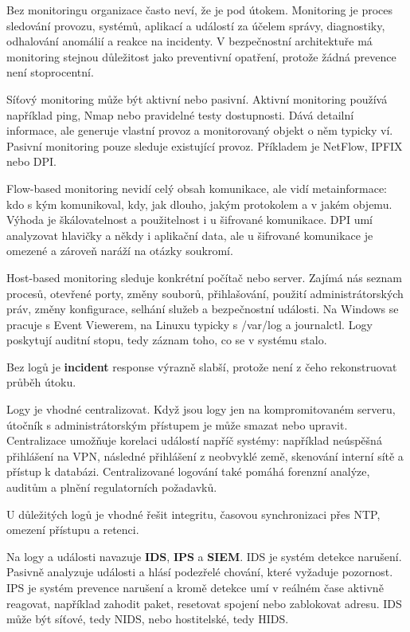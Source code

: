 \documentclass[11pt,a4paper]{article}
\begin{document}
Bez monitoringu organizace často neví, že je pod útokem. Monitoring je proces sledování provozu, systémů, aplikací a událostí za účelem správy, diagnostiky, odhalování anomálií a reakce na incidenty. V bezpečnostní architektuře má monitoring stejnou důležitost jako preventivní opatření, protože žádná prevence není stoprocentní.

Síťový monitoring může být aktivní nebo pasivní. Aktivní monitoring používá například ping, Nmap nebo pravidelné testy dostupnosti. Dává detailní informace, ale generuje vlastní provoz a monitorovaný objekt o něm typicky ví. Pasivní monitoring pouze sleduje existující provoz. Příkladem je NetFlow, IPFIX nebo DPI.

Flow-based monitoring nevidí celý obsah komunikace, ale vidí metainformace: kdo s kým komunikoval, kdy, jak dlouho, jakým protokolem a v jakém objemu. Výhoda je škálovatelnost a použitelnost i u šifrované komunikace. DPI umí analyzovat hlavičky a někdy i aplikační data, ale u šifrované komunikace je omezené a zároveň naráží na otázky soukromí.

Host-based monitoring sleduje konkrétní počítač nebo server. Zajímá nás seznam procesů, otevřené porty, změny souborů, přihlašování, použití administrátorských práv, změny konfigurace, selhání služeb a bezpečnostní události. Na Windows se pracuje s Event Viewerem, na Linuxu typicky s /var/log a journalctl. Logy poskytují auditní stopu, tedy záznam toho, co se v systému stalo.

Bez logů je \textbf{incident} response výrazně slabší, protože není z čeho rekonstruovat průběh útoku.

Logy je vhodné centralizovat. Když jsou logy jen na kompromitovaném serveru, útočník s administrátorským přístupem je může smazat nebo upravit. Centralizace umožňuje korelaci událostí napříč systémy: například neúspěšná přihlášení na VPN, následné přihlášení z neobvyklé země, skenování interní sítě a přístup k databázi. Centralizované logování také pomáhá forenzní analýze, auditům a plnění regulatorních požadavků.

U důležitých logů je vhodné řešit integritu, časovou synchronizaci přes NTP, omezení přístupu a retenci.

Na logy a události navazuje \textbf{IDS}, \textbf{IPS} a \textbf{SIEM}. IDS je systém detekce narušení. Pasivně analyzuje události a hlásí podezřelé chování, které vyžaduje pozornost. IPS je systém prevence narušení a kromě detekce umí v reálném čase aktivně reagovat, například zahodit paket, resetovat spojení nebo zablokovat adresu. IDS může být síťové, tedy NIDS, nebo hostitelské, tedy HIDS.
\end{document}
